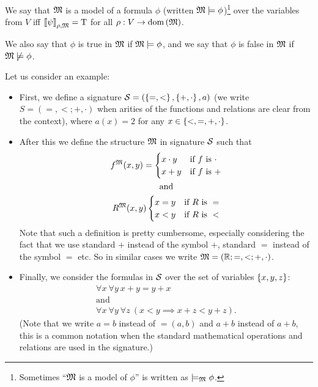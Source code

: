 We say that $\mathfrak{M}$ is a model of a formula $\phi$
(written $\mathfrak{M} \models \phi$)\footnote{
  Sometimes ``$\mathfrak{M}$ is a model of $\phi$'' is written
  as $\models_{\mathfrak{M}} \phi$.
} over the variables
from $V$ iff $\left\llbracket {\psi} \right\rrbracket_{\rho, \mathfrak{M}} = \text{T}$ for all $\rho : V
\to \mathrm{dom}\left({\mathfrak{M}}\right)$.

We also say that $\phi$ is true in $\mathfrak{M}$ if $\mathfrak{M} \models \phi$,
and we say that $\phi$ is false in $\mathfrak{M}$ if $\mathfrak{M} \not\models \phi$.

Let us consider an example:
\begin{itemize}
  \item First, we define a signature
    $\signature{S} = (\set{=, <}, \set{+, \cdot}, a)$ (we write 
    $S = (=, <; +, \cdot)$ when arities of the functions and relations are clear
    from the context),
    where $a(x) = 2$ for any $x \in \set{<, =, +, \cdot}$.
  \item After this we define the structure $\mathfrak{M}$ in signature
    $\mathcal{S}$ such that
    \begin{gather*}
      f^{\mathfrak{M}}(x, y) = \begin{cases}
        x \cdot y & \text{if } f \text{ is } \cdot \\
        x + y & \text{if } f \text{ is } +
      \end{cases} \\
      \text{and} \\
      R^{\mathfrak{M}}(x, y) \begin{cases}
        x = y & \text{if } R \text{ is } = \\
        x < y & \text{if } R \text{ is } <
      \end{cases}
    \end{gather*}
    Note that such a definition is pretty cumbersome, especially considering the
    fact that we use standard $+$ instead of the symbol $+$,
    standard $=$ instead of the symbol $=$ etc. So in similar cases we
    write $\mathfrak{M} = ({\mathbb{R}}; =, <; +, \cdot)$.
  \item Finally, we consider the formulas in $\mathcal{S}$ over the set of
    variables $\set{x, y, z}$:
    \begin{gather*}
      \forall x \ \forall y \ x + y = y + x \\
      \text{and} \\
      \forall x \ \forall y \ \forall z \ (x < y \implies x + z < y + z).
    \end{gather*}
    (Note that we write $a = b$ instead of $=(a, b)$ and $a + b$ instead of
    $a + b$, this is a common notation when the standard mathematical
    operations and relations are used in the signature.)
\end{itemize}

